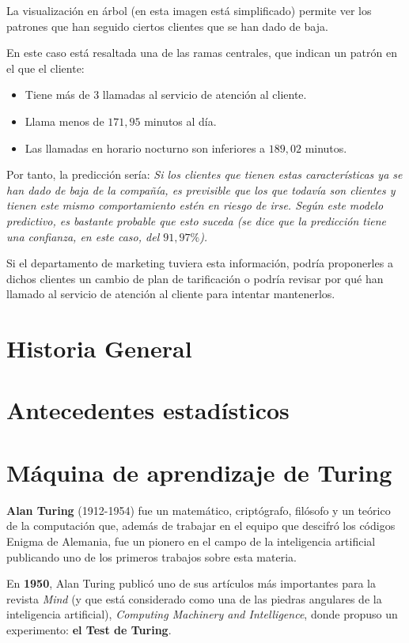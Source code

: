 \documentclass[a4paper, 11pt]{article} %
\begin{document}
\begin{shaded}
La visualización en árbol (en esta imagen está simplificado) permite ver los patrones que han seguido ciertos clientes que se han dado de baja.

En este caso está resaltada una de las ramas centrales, que indican un patrón en el que el cliente:
\begin{itemize}
    \item Tiene más de $3$ llamadas al servicio de atención al cliente.
    \item Llama menos de $171,95$ minutos al día.
    \item Las llamadas en horario nocturno son inferiores a $189,02$ minutos.
\end{itemize}

Por tanto, la predicción sería: \textit{Si los clientes que tienen estas características ya se han dado de baja de la compañía, es previsible que los que todavía son clientes y tienen este mismo comportamiento estén en riesgo de irse. Según este modelo predictivo, es bastante probable que esto suceda (se dice que la predicción tiene una confianza, en este caso, del $91,97\%$).}

Si el departamento de marketing tuviera esta información, podría proponerles a dichos clientes un cambio de plan de tarificación o podría revisar por qué han llamado al servicio de atención al cliente para intentar mantenerlos.
\end{shaded}
\section{Historia General}

\newpage

\section{Antecedentes estadísticos}
\section{Máquina de aprendizaje de Turing}
\textbf{Alan Turing} (1912-1954) fue un matemático, criptógrafo, filósofo y un teórico de la computación que, además de trabajar en el equipo que descifró los códigos Enigma de Alemania, fue un pionero en el campo de la inteligencia artificial publicando uno de los primeros trabajos sobre esta materia.

En \textbf{1950}, Alan Turing publicó uno de sus artículos más importantes para la revista \textit{Mind} (y que está considerado como una de las piedras angulares de la inteligencia artificial), \textit{Computing Machinery and Intelligence}, donde propuso un experimento: \textbf{el Test de Turing}.
\end{document}
